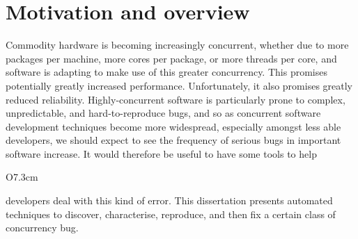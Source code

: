 
\section{Motivation and overview}
\label{sect:intro:overview}

Commodity hardware is becoming increasingly concurrent, whether due to
more packages per machine, more cores per package, or more threads per
core, and software is adapting to make use of this greater
concurrency.  This promises potentially greatly increased performance.
Unfortunately, it also promises greatly reduced reliability.
Highly-concurrent software is particularly prone to complex,
unpredictable, and hard-to-reproduce bugs, and so as concurrent
software development techniques become more widespread, especially
amongst less able developers, we should expect to see the frequency of
serious bugs in important software increase.  It would therefore be
useful to have some tools to help
\begin{wrapfigure}{O}{7.3cm}
\vspace{-12pt}
\end{wrapfigure}
developers deal with this kind of
error.  This dissertation presents automated techniques to discover,
characterise, reproduce, and then fix a certain class of concurrency
bug.

